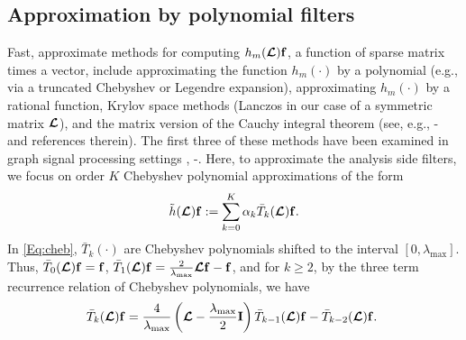 \documentclass[journal, 10pt]{IEEEtran}
\begin{document}
\subsection{Approximation by polynomial filters} \label{Se:poly_approx}

Fast, approximate methods for computing $h_m(\boldsymbol{\mathcal{L}}){\bf f}$, a function of sparse matrix times a vector, include approximating the function $h_m(\cdot)$ by a polynomial (e.g., via a truncated Chebyshev or Legendre expansion), approximating $h_m(\cdot)$ by a rational function, Krylov space methods (Lanczos in our case of a symmetric matrix $\boldsymbol{\mathcal{L}}$), and the matrix version of the Cauchy integral theorem (see, e.g., \cite{higham}\nocite{davies2005computing, frommer}-\cite{dubious} and references therein). The first three of these methods have been examined in graph signal processing settings \cite{hammond2011wavelets,PuyTGV15},  \cite{shuman_distributed_sipn}\nocite{susnjara, shi2015infinite}-\cite{loukas2015distributed}. %
Here, to approximate the analysis side filters, %
we focus on order $K$ Chebyshev polynomial approximations of the form
\begin{align}\label{Eq:cheb}
\tilde{h}(\L){\bf f} := \sum_{k=0}^K \alpha_k \bar{T}_k(\L){\bf f}.
\end{align}
In \eqref{Eq:cheb}, $\bar{T}_k(\cdot)$ are Chebyshev polynomials shifted to the interval $[0,\lambda_{\max}]$. Thus,  $\bar{T}_0(\boldsymbol{\mathcal{L}}){\bf f} = {\bf f}$, $\bar{T}_1(\boldsymbol{\mathcal{L}}){\bf f} = \frac{2}{\lambda_{\max}}\boldsymbol{\mathcal{L}}{\bf f}-{\bf f}$, and for $k\geq 2$, by the three term recurrence relation of Chebyshev polynomials, we have
\begin{align}\label{Eq:Tkbar_rec}
\hspace{-.05in}\bar{T}_k(\L){\bf f} = \frac{4}{\lambda_{\max}}\left(\L-\frac{\lambda_{\max}}{2}{\bf I}\right)\bar{T}_{k-1}(\L){\bf f}-\bar{T}_{k-2}(\L){\bf f}.
\end{align}
\end{document}
